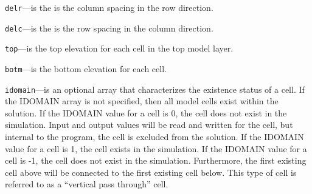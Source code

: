 \begin{description}
\item \texttt{delr}---is the is the column spacing in the row direction.

\item \texttt{delc}---is the is the row spacing in the column direction.

\item \texttt{top}---is the top elevation for each cell in the top model layer.

\item \texttt{botm}---is the bottom elevation for each cell.

\item \texttt{idomain}---is an optional array that characterizes the existence status of a cell.  If the IDOMAIN array is not specified, then all model cells exist within the solution.  If the IDOMAIN value for a cell is 0, the cell does not exist in the simulation.  Input and output values will be read and written for the cell, but internal to the program, the cell is excluded from the solution.  If the IDOMAIN value for a cell is 1, the cell exists in the simulation.  If the IDOMAIN value for a cell is -1, the cell does not exist in the simulation.  Furthermore, the first existing cell above will be connected to the first existing cell below.  This type of cell is referred to as a ``vertical pass through'' cell.

\end{description}

